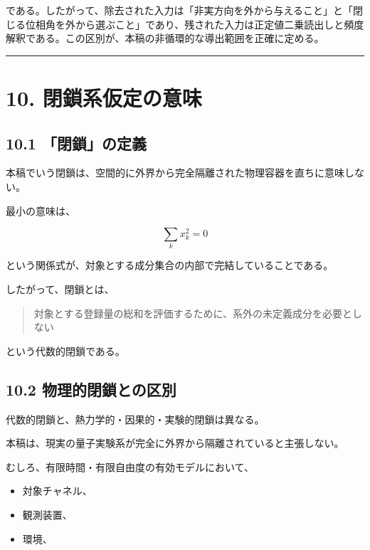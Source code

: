 \documentclass[
  a4paper,
  10pt]{article}
\providecommand{\tightlist}{%
  \setlength{\itemsep}{0pt}\setlength{\parskip}{0pt}}
\begin{document}
である。したがって、除去された入力は「非実方向を外から与えること」と「閉じる位相角を外から選ぶこと」であり、残された入力は正定値二乗読出しと頻度解釈である。この区別が、本稿の非循環的な導出範囲を正確に定める。

\begin{center}\rule{0.5\linewidth}{0.5pt}\end{center}

\section{10.
閉鎖系仮定の意味}\label{10-ux9589ux9396ux7cfbux4eeeux5b9aux306eux610fux5473}

\subsection{10.1
「閉鎖」の定義}\label{101-ux9589ux9396ux306eux5b9aux7fa9}

本稿でいう閉鎖は、空間的に外界から完全隔離された物理容器を直ちに意味しない。

最小の意味は、

\[
\sum_kx_k^2=0
\]

という関係式が、対象とする成分集合の内部で完結していることである。

したがって、閉鎖とは、

\begin{quote}
対象とする登録量の総和を評価するために、系外の未定義成分を必要としない
\end{quote}

という代数的閉鎖である。

\subsection{10.2
物理的閉鎖との区別}\label{102-ux7269ux7406ux7684ux9589ux9396ux3068ux306eux533aux5225}

代数的閉鎖と、熱力学的・因果的・実験的閉鎖は異なる。

本稿は、現実の量子実験系が完全に外界から隔離されていると主張しない。

むしろ、有限時間・有限自由度の有効モデルにおいて、

\begin{itemize}
\tightlist
\item
  対象チャネル、
\item
  観測装置、
\item
  環境、
\end{itemize}
\end{document}
